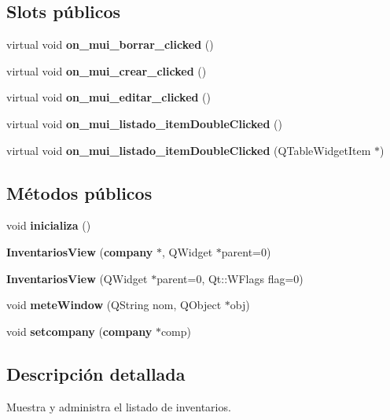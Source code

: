 \subsection*{Slots p\'{u}blicos}
\begin{CompactItemize}
\item 
virtual void {\bf on\_\-mui\_\-borrar\_\-clicked} ()
\item 
virtual void {\bf on\_\-mui\_\-crear\_\-clicked} ()\label{classInventariosView_i1}

\item 
virtual void {\bf on\_\-mui\_\-editar\_\-clicked} ()\label{classInventariosView_i2}

\item 
virtual void {\bf on\_\-mui\_\-listado\_\-item\-Double\-Clicked} ()\label{classInventariosView_i3}

\item 
virtual void {\bf on\_\-mui\_\-listado\_\-item\-Double\-Clicked} (QTable\-Widget\-Item $\ast$)\label{classInventariosView_i4}

\end{CompactItemize}
\subsection*{M\'{e}todos p\'{u}blicos}
\begin{CompactItemize}
\item 
void {\bf inicializa} ()\label{classInventariosView_a0}

\item 
{\bf Inventarios\-View} ({\bf company} $\ast$, QWidget $\ast$parent=0)\label{classInventariosView_a1}

\item 
{\bf Inventarios\-View} (QWidget $\ast$parent=0, Qt::WFlags flag=0)\label{classInventariosView_a2}

\item 
void {\bf mete\-Window} (QString nom, QObject $\ast$obj)\label{classInventariosView_a3}

\item 
void {\bf setcompany} ({\bf company} $\ast$comp)\label{classInventariosView_a4}

\end{CompactItemize}


\subsection{Descripci\'{o}n detallada}
Muestra y administra el listado de inventarios. 



